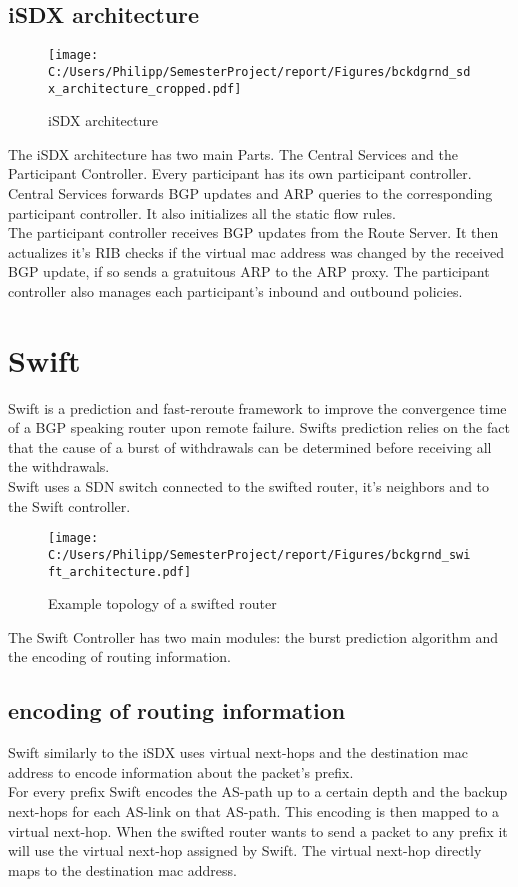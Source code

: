 \subsection{\label{chapter2:iSX:iSDX architecture}iSDX architecture}
\begin{figure}[h]
\texttt{[image: C:/Users/Philipp/SemesterProject/report/Figures/bckdgrnd\_sdx\_architecture\_cropped.pdf]}
\caption{iSDX architecture}
\end{figure}

The iSDX architecture has two main Parts. The Central Services and the Participant Controller. Every participant has its own participant controller. \\
Central Services forwards BGP updates and ARP queries to the corresponding participant controller. It also initializes all the static flow rules. \\
The participant controller receives BGP updates from the Route Server. It then actualizes it's RIB checks if the virtual mac address was changed by the received BGP update, if so sends a gratuitous ARP to the ARP proxy. The participant controller also manages each participant's inbound and outbound policies. 

\section{\label{chapter2:Swift}Swift}

Swift is a prediction and fast-reroute framework to improve the convergence time of a BGP speaking router upon remote failure. Swifts prediction relies on the fact that the cause of a burst of withdrawals can be determined before receiving all the withdrawals. \\ Swift uses a SDN switch connected to the swifted router, it's neighbors and to the Swift controller. 


\begin{figure}[h]
\center
\texttt{[image: C:/Users/Philipp/SemesterProject/report/Figures/bckgrnd\_swift\_architecture.pdf]}
\caption{Example topology of a swifted router}
\end{figure}

The Swift Controller has two main modules: the burst prediction algorithm and the encoding of routing information. 

\subsection{\label{chapter2:Swift:encoding of routing information}encoding of routing information}
Swift similarly to the iSDX uses virtual next-hops and the destination mac address to encode information about the packet's prefix.\\
For every prefix Swift encodes the AS-path up to a certain depth and the backup next-hops for each AS-link on that AS-path. This encoding is then mapped to a virtual next-hop. When the swifted router wants to send a packet to any prefix it will use the virtual next-hop assigned by Swift. The virtual next-hop directly maps to the destination mac address. 

